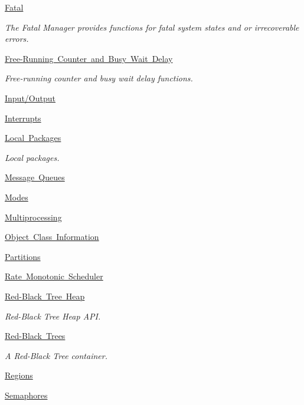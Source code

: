 \begin{DoxyCompactItemize}
\mbox{\hyperlink{group__ClassicFatal}{Fatal}}
\begin{DoxyCompactList}\small\item\em The Fatal Manager provides functions for fatal system states and or irrecoverable errors. \end{DoxyCompactList}\item 
\mbox{\hyperlink{group__ClassicCounter}{Free-\/\+Running Counter and Busy Wait Delay}}
\begin{DoxyCompactList}\small\item\em Free-\/running counter and busy wait delay functions. \end{DoxyCompactList}\item 
\mbox{\hyperlink{group__ClassicIO}{Input/\+Output}}
\item 
\mbox{\hyperlink{group__ClassicINTR}{Interrupts}}
\item 
\mbox{\hyperlink{group__LocalPackages}{Local Packages}}
\begin{DoxyCompactList}\small\item\em Local packages. \end{DoxyCompactList}\item 
\mbox{\hyperlink{group__ClassicMessageQueue}{Message Queues}}
\item 
\mbox{\hyperlink{group__ClassicModes}{Modes}}
\item 
\mbox{\hyperlink{group__ClassicMP}{Multiprocessing}}
\item 
\mbox{\hyperlink{group__ClassicClassInfo}{Object Class Information}}
\item 
\mbox{\hyperlink{group__ClassicPart}{Partitions}}
\item 
\mbox{\hyperlink{group__ClassicRateMon}{Rate Monotonic Scheduler}}
\item 
\mbox{\hyperlink{group__RBHeap}{Red-\/\+Black Tree Heap}}
\begin{DoxyCompactList}\small\item\em Red-\/\+Black Tree Heap A\+PI. \end{DoxyCompactList}\item 
\mbox{\hyperlink{group__ClassicRBTrees}{Red-\/\+Black Trees}}
\begin{DoxyCompactList}\small\item\em A Red-\/\+Black Tree container. \end{DoxyCompactList}\item 
\mbox{\hyperlink{group__ClassicRegion}{Regions}}
\item 
\mbox{\hyperlink{group__ClassicSem}{Semaphores}}

\end{DoxyCompactItemize}
